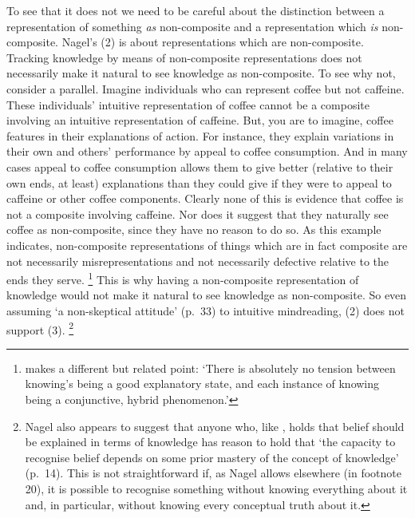 \documentclass[11pt,a4paper]{extarticle}
\begin{document}
To see that it does not we need  to be careful about the distinction between 
a representation of something \emph{as} non-composite 
and
a representation which \emph{is} non-composite.
Nagel's (2) is about representations which are non-composite.
Tracking knowledge by means of non-composite representations does not necessarily make it natural to see knowledge as non-composite.
To see why not, consider a parallel.
Imagine individuals who can represent coffee but not caffeine.
These individuals' intuitive representation of coffee cannot be a composite involving an intuitive representation of caffeine.
But, you are to imagine, coffee features in their explanations of action.
For instance, they explain variations in their own and others' performance by appeal to coffee consumption.
And in many cases appeal to coffee consumption allows them to give better (relative to their own ends, at least) explanations than they could give if they were to appeal to caffeine or other coffee components.
Clearly none of this is evidence that coffee is not a composite involving caffeine.
Nor does it suggest that they naturally see coffee as non-composite, since they have no reason to do so.
As this example indicates, 
non-composite representations of things which are in fact composite are 
not necessarily misrepresentations
and
not necessarily defective relative to the ends they serve.%
\footnote{
\citet[p.\ 51]{fricker_2009} makes a different but related point: `There is absolutely no tension between knowing's being a good explanatory state, and each instance of knowing being a conjunctive, hybrid phenomenon.'
}
This is why having a non-composite representation of knowledge would not make it natural to see knowledge as  non-composite.
So even assuming `a non-skeptical attitude' (p.\ 33) to intuitive mindreading, (2) does not support (3).%
\footnote{
Nagel also appears to suggest that anyone who, like \citet{Williamson:2000xz}, holds that belief should be explained in terms of knowledge 
has reason to hold that `the capacity to recognise belief depends on some prior mastery of the concept of knowledge' (p.\ 14).
This is not straightforward if, as Nagel allows elsewhere (in footnote 20), it is possible to recognise something without knowing everything about it and, in particular, without knowing every conceptual truth about it. 
}
\end{document}
